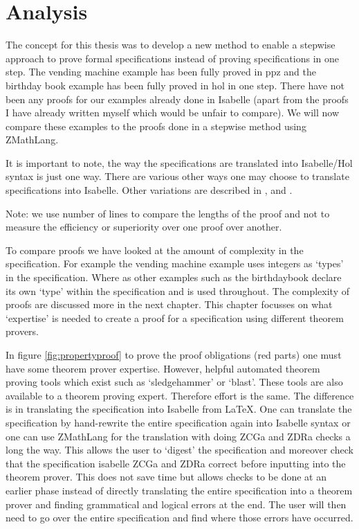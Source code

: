 \chapter{Analysis}
\label{ch:analysis}

The concept for this thesis was to develop a new method to enable a stepwise
approach to prove formal specifications instead of proving specifications
in one step. The vending machine example has been fully proved
in \gls{ppz} and the birthday book example has been fully proved in \gls{hol} in
one step.
There have not been any proofs for our examples already done in Isabelle (apart
from the proofs I have already written myself which would be unfair to compare).
We will now compare these examples to the proofs done in a
stepwise method using ZMathLang.

It is important to note, the way the specifications are translated into
Isabelle/Hol syntax is just one way. There are various other ways one may choose
to translate specifications into Isabelle. Other variations are
described in \cite{Kolyang1996}, \cite{Kolyang86towardsa} and \cite{hol-z}.

Note: we use number of lines to compare the lengths of the proof and not
to measure the efficiency  or superiority over one proof over another.

To compare proofs we have looked at the amount of complexity in the specification.
For example the vending machine example uses integers as `types' in the specification.
Where as other examples such as the birthdaybook declare its own `type' within
the specification and is used throughout. The complexity of proofs are discussed more in the
next chapter.
This chapter focusses on what `expertise' is needed to create a proof for a specification
using different theorem provers.

In figure \ref{fig:propertyproof} to prove the proof obligations (red parts) one must have some
theorem prover expertise. However, helpful automated theorem proving tools which exist such as 
`sledgehammer' or `blast'. These tools are also available to a theorem proving expert. Therefore
effort is the same.
The difference is in translating the specification into Isabelle from \LaTeX. One can 
translate the specification by hand-rewrite the entire specification again into Isabelle syntax
or one can use ZMathLang for the translation with doing ZCGa and ZDRa checks a long the way.
This allows the user to `digest' the specification and moreover check that the specification isabelle
ZCGa and ZDRa correct before inputting into the theorem prover. This does not save time but 
allows checks to be done at an earlier phase instead of directly translating the entire specification
into a theorem prover and finding grammatical and logical errors at the end. The user will then
need to go over the entire specification and find where those errors have occurred.

